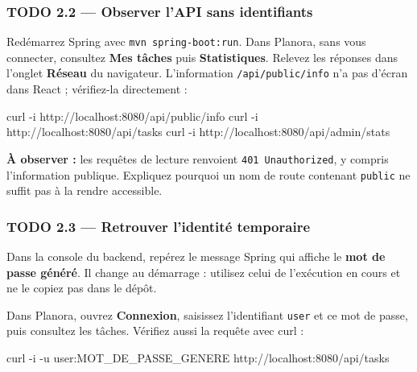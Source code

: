 \documentclass[
  french,
  10pt,
  a4paper,
]{article}
\newenvironment{Shaded}{}{}
\newcommand{\AttributeTok}[1]{\textcolor[rgb]{0.49,0.56,0.16}{#1}}
\newcommand{\ExtensionTok}[1]{#1}
\newcommand{\NormalTok}[1]{#1}
\begin{document}
\subsubsection{TODO 2.2 --- Observer l'API sans
identifiants}\label{todo-2.2-observer-lapi-sans-identifiants}

Redémarrez Spring avec \texttt{mvn\ spring-boot:run}. Dans Planora, sans
vous connecter, consultez \textbf{Mes tâches} puis
\textbf{Statistiques}. Relevez les réponses dans l'onglet
\textbf{Réseau} du navigateur. L'information \texttt{/api/public/info}
n'a pas d'écran dans React ; vérifiez-la directement :

\begin{Shaded}
\begin{Highlighting}[]
\ExtensionTok{curl} \AttributeTok{{-}i}\NormalTok{ http://localhost:8080/api/public/info}
\ExtensionTok{curl} \AttributeTok{{-}i}\NormalTok{ http://localhost:8080/api/tasks}
\ExtensionTok{curl} \AttributeTok{{-}i}\NormalTok{ http://localhost:8080/api/admin/stats}
\end{Highlighting}
\end{Shaded}

\textbf{À observer :} les requêtes de lecture renvoient
\texttt{401\ Unauthorized}, y compris l'information publique. Expliquez
pourquoi un nom de route contenant \texttt{public} ne suffit pas à la
rendre accessible.

\subsubsection{TODO 2.3 --- Retrouver l'identité
temporaire}\label{todo-2.3-retrouver-lidentituxe9-temporaire}

Dans la console du backend, repérez le message Spring qui affiche le
\textbf{mot de passe généré}. Il change au démarrage : utilisez celui de
l'exécution en cours et ne le copiez pas dans le dépôt.

Dans Planora, ouvrez \textbf{Connexion}, saisissez l'identifiant
\texttt{user} et ce mot de passe, puis consultez les tâches. Vérifiez
aussi la requête avec curl :

\begin{Shaded}
\begin{Highlighting}[]
\ExtensionTok{curl} \AttributeTok{{-}i} \AttributeTok{{-}u}\NormalTok{ user:MOT\_DE\_PASSE\_GENERE http://localhost:8080/api/tasks}
\end{Highlighting}
\end{Shaded}
\end{document}
